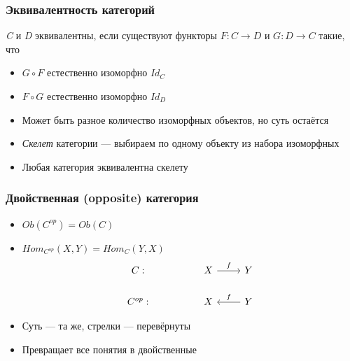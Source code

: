 \documentclass{beamer}
\begin{document}
\begin{frame}
\frametitle{Эквивалентность категорий}
\textit{C} и \textit{D} эквивалентны, если существуют функторы \begin{math}F:C\rightarrow D\end{math} и \begin{math}G:D\rightarrow C\end{math} такие, что 
\begin{itemize}
\item \begin{math}G\circ F\end{math} естественно изоморфно \begin{math}Id_C\end{math}
\item \begin{math}F\circ G\end{math} естественно изоморфно \begin{math}Id_D\end{math}
\end{itemize}
\pause
\begin{itemize}
\item Может быть разное количество изоморфных объектов, но суть остаётся
\item \textit{Скелет} категории --- выбираем по одному объекту из набора изоморфных
\item Любая категория эквивалентна скелету
\end{itemize}
\end{frame}

\begin{frame}[fragile]
\frametitle{Двойственная (opposite) категория}
\begin{itemize}
\item \begin{math}Ob(C^{op}) = Ob(C)\end{math}
\item \begin{math}Hom_{C^{op}}(X, Y) = Hom_C(Y,X)\end{math}
\pause
\begin{equation}
\begin{tikzcd}
C: && X \arrow{r}{f} & Y \\
C^{op}: && X & \arrow{l}[swap]{f} Y
\end{tikzcd}
\end{equation}
\pause
\item Суть --- та же, стрелки --- перевёрнуты
\item Превращает все понятия в двойственные
\end{itemize}
\end{frame}
\end{document}
